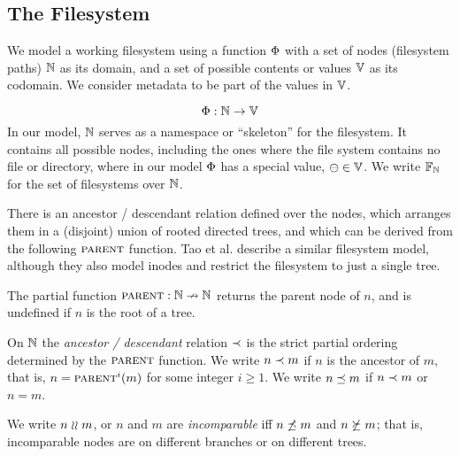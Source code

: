 
\subsection{The Filesystem}

We model a working filesystem
using a function $\Phi$ with a set of nodes (filesystem paths) $\mathbb{N}$ as its domain,
and a set of possible contents or values $\mathbb{V}$ as its codomain.
We consider metadata to be part of the values in $\mathbb{V}$.
\begin{mydef}
\[ \Phi: \mathbb{N} \rightarrow \mathbb{V} \]
In our model, $\mathbb{N}$ 
serves as a namespace or ``skeleton'' for the filesystem.
It contains all possible nodes, including the ones 
where the file system contains no file or directory,
where in our model $\Phi$ has a special value, $\ominus\in\mathbb{V}$.
We write $\mathbb{F}_{\mathbb{N}}$ for the set of filesystems over $\mathbb{N}$.
\end{mydef}

There is an ancestor / descendant relation defined over the nodes,
which arranges them in a (disjoint) union of rooted directed trees,
and which can be derived from the following $\parent$ function.
Tao et al. \cite{TSR} describe a similar filesystem model, although
they also model inodes and restrict the filesystem to just a single tree.
\begin{mydef}[$\parent$]
The partial function $\text{\normalfont\scshape{parent}}:\mathbb{N}\nrightarrow\mathbb{N}$
returns the parent node of $n$,
and is undefined if $n$ is the root of a tree.
\end{mydef}

\begin{mydef}[$\descendant$, $\descendantEq$]
On $\mathbb{N}$ the \emph{ancestor / descendant} relation $\descendant$ is the
strict partial ordering determined by the $\parent$ function.
We write $n\prec m$ if $n$ is the ancestor of $m$,
that is, $n=\text{\normalfont\scshape{parent}}^i(m)$ for some integer $i\ge 1$.
We write $n\preceq m$ if $n\prec m$ or $n=m$.
\end{mydef}

\begin{mydef}[$n\unrel m$]
We write $n\unrel m$, or $n$ and $m$ are \emph{incomparable}
iff $n\not\preceq m$ and $n\not\succeq m$;
that is, incomparable nodes are on different branches or on different trees.
\end{mydef}

